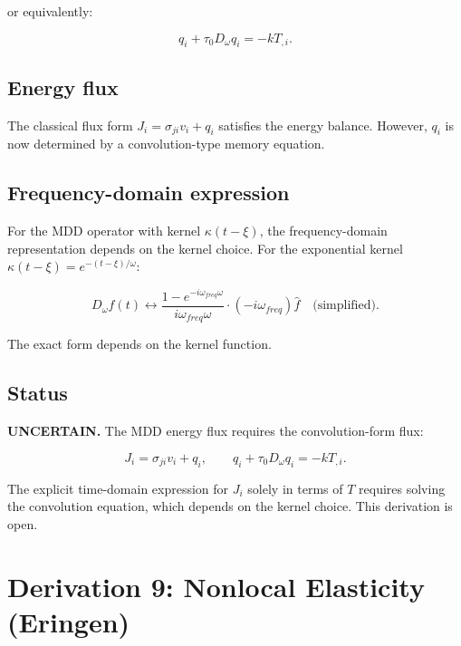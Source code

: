 or equivalently:

\begin{equation}
q_i + \tau_0 D_\omega q_i = -k T_{,i}.
\label{ef:mdd:3}
\end{equation}

\subsection{Energy flux}

The classical flux form $J_i = \sigma_{ji}v_i + q_i$ satisfies the energy balance. However, $q_i$ is now determined by a convolution-type memory equation.

\subsection{Frequency-domain expression}

For the MDD operator with kernel $\kappa(t-\xi)$, the frequency-domain representation depends on the kernel choice. For the exponential kernel $\kappa(t-\xi) = e^{-(t-\xi)/\omega}$:

\begin{equation}
D_\omega f(t) \leftrightarrow \frac{1 - e^{-i\omega_{freq}\omega}}{i\omega_{freq}\omega} \cdot (-i\omega_{freq})\hat{f} \quad \text{(simplified)}.
\label{ef:mdd:4}
\end{equation}

The exact form depends on the kernel function.

\subsection{Status}

\textbf{UNCERTAIN.} The MDD energy flux requires the convolution-form flux:

\begin{equation}
J_i = \sigma_{ji}v_i + q_i,
\qquad q_i + \tau_0 D_\omega q_i = -k T_{,i}.
\label{ef:mdd:5}
\end{equation}

The explicit time-domain expression for $J_i$ solely in terms of $T$ requires solving the convolution equation, which depends on the kernel choice. This derivation is open.

\section{Derivation 9: Nonlocal Elasticity (Eringen)}


